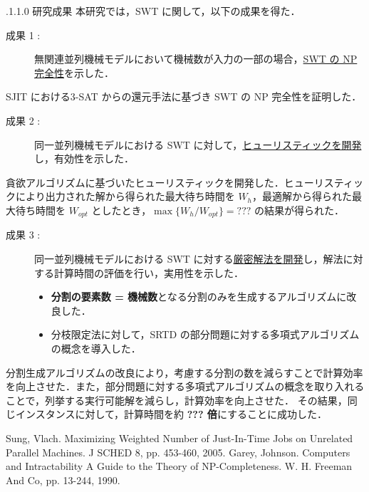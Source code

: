 \documentclass[oneside, 10pt, twocolumn]{jarticle}
\makeatletter
\def\section{\@startsection {section}{1}{\z@}{-3.5ex plus -1ex minus
-.2ex}{2.3 ex plus .2ex}{\large\bf}}
\renewcommand{\section}{
\@startsection{section}{1}{\z@}
{.1\Cvs \@plus.0\Cdp \@minus.1\Cdp}%
{.1\Cvs \@plus.1\Cdp \@minus.0\Cdp}%
{\reset@font\large\bfseries}}      %
\makeatother
\begin{document}
\section{研究成果}
本研究では，SWT に関して，以下の成果を得た．
\begin{description}
  \item[成果 1 : ]
  無関連並列機械モデルにおいて機械数が入力の一部の場合，\underline{SWT の NP 完全性}を示した．
\end{description}
SJIT における\textsc{3-SAT} からの還元手法に基づき SWT の NP 完全性を証明した．

\begin{description}
  \item[成果 2 : ]
  同一並列機械モデルにおける SWT に対して，\underline{ヒューリスティックを開発}し，有効性を示した．
\end{description}
貪欲アルゴリズムに基づいたヒューリスティックを開発した．ヒューリスティックにより出力された解から得られた最大待ち時間を $W_h$，最適解から得られた最大待ち時間を $W_{opt}$ としたとき，\mbox{\boldmath $\max\big\{W_h/W_{opt}\big\} = ???$} の結果が得られた．

\begin{description}
  \item[成果 3 : ]
  同一並列機械モデルにおける SWT に対する\underline{厳密解法を開発}し，解法に対する計算時間の評価を行い，実用性を示した．
  \begin{itemize}
    \setlength{\leftskip}{-10mm}
    \item {\bf 分割の要素数 = 機械数}となる分割のみを生成するアルゴリズムに改良した．
    \item 分枝限定法に対して，SRTD の部分問題に対する多項式アルゴリズムの概念を導入した．
  \end{itemize}
\end{description}
分割生成アルゴリズムの改良により，考慮する分割の数を減らすことで計算効率を向上させた．また，部分問題に対する多項式アルゴリズムの概念を取り入れることで，列挙する実行可能解を減らし，計算効率を向上させた．
その結果，同じインスタンスに対して，計算時間を約 {\bf ??? 倍}にすることに成功した．

\begin{thebibliography}{9} %
  Sung, Vlach.
  Maximizing Weighted Number of Just-In-Time Jobs on Unrelated Parallel Machines. J SCHED 8, pp. 453-460, 2005.
  \vspace{-2mm}
  Garey, Johnson.
  Computers and Intractability A Guide to the Theory of NP-Completeness.
  W. H. Freeman And Co, pp. 13-244, 1990.
\end{thebibliography}
\end{document}
